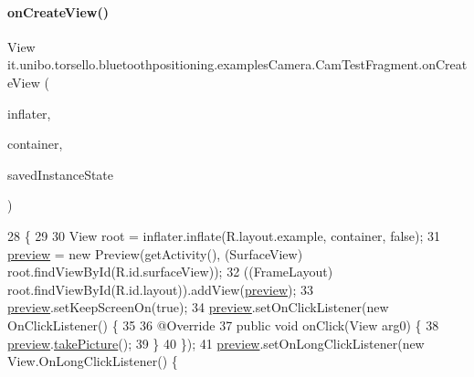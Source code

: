 \paragraph{\texorpdfstring{on\+Create\+View()}{onCreateView()}}
{\footnotesize\ttfamily View it.\+unibo.\+torsello.\+bluetoothpositioning.\+examples\+Camera.\+Cam\+Test\+Fragment.\+on\+Create\+View (\begin{DoxyParamCaption}\item[{Layout\+Inflater}]{inflater,  }\item[{View\+Group}]{container,  }\item[{Bundle}]{saved\+Instance\+State }\end{DoxyParamCaption})}


\begin{DoxyCode}
28                                                                                                       \{
29 
30         View root = inflater.inflate(R.layout.example, container, \textcolor{keyword}{false});
31         \hyperlink{classit_1_1unibo_1_1torsello_1_1bluetoothpositioning_1_1examplesCamera_1_1CamTestFragment_ae917d2bc3cab2f7a1641a78cce044fd9_ae917d2bc3cab2f7a1641a78cce044fd9}{preview} = \textcolor{keyword}{new} Preview(getActivity(), (SurfaceView) root.findViewById(R.id.surfaceView));
32         ((FrameLayout) root.findViewById(R.id.layout)).addView(\hyperlink{classit_1_1unibo_1_1torsello_1_1bluetoothpositioning_1_1examplesCamera_1_1CamTestFragment_ae917d2bc3cab2f7a1641a78cce044fd9_ae917d2bc3cab2f7a1641a78cce044fd9}{preview});
33         \hyperlink{classit_1_1unibo_1_1torsello_1_1bluetoothpositioning_1_1examplesCamera_1_1CamTestFragment_ae917d2bc3cab2f7a1641a78cce044fd9_ae917d2bc3cab2f7a1641a78cce044fd9}{preview}.setKeepScreenOn(\textcolor{keyword}{true});
34         \hyperlink{classit_1_1unibo_1_1torsello_1_1bluetoothpositioning_1_1examplesCamera_1_1CamTestFragment_ae917d2bc3cab2f7a1641a78cce044fd9_ae917d2bc3cab2f7a1641a78cce044fd9}{preview}.setOnClickListener(\textcolor{keyword}{new} OnClickListener() \{
35 
36             @Override
37             \textcolor{keyword}{public} \textcolor{keywordtype}{void} onClick(View arg0) \{
38                 \hyperlink{classit_1_1unibo_1_1torsello_1_1bluetoothpositioning_1_1examplesCamera_1_1CamTestFragment_ae917d2bc3cab2f7a1641a78cce044fd9_ae917d2bc3cab2f7a1641a78cce044fd9}{preview}.\hyperlink{classit_1_1unibo_1_1torsello_1_1bluetoothpositioning_1_1examplesCamera_1_1Preview_afa7f533cc47be1bf7be2b1d1bfa43600_afa7f533cc47be1bf7be2b1d1bfa43600}{takePicture}();
39             \}
40         \});
41         \hyperlink{classit_1_1unibo_1_1torsello_1_1bluetoothpositioning_1_1examplesCamera_1_1CamTestFragment_ae917d2bc3cab2f7a1641a78cce044fd9_ae917d2bc3cab2f7a1641a78cce044fd9}{preview}.setOnLongClickListener(\textcolor{keyword}{new} View.OnLongClickListener() \{

\end{DoxyCode}
